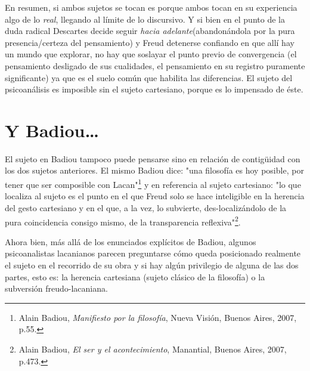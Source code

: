 En resumen, si ambos sujetos se tocan es porque ambos tocan en su
experiencia algo de lo \emph{real}, llegando al límite de lo discursivo.
Y si bien en el punto de la duda radical Descartes decide seguir
\emph{hacia adelante}(abandonándola por la pura presencia/certeza del
pensamiento) y Freud detenerse confiando en que allí hay un mundo que
explorar, no hay que soslayar el punto previo de convergencia (el
pensamiento desligado de sus cualidades, el pensamiento en su registro
puramente significante) ya que es el suelo común que habilita las
diferencias. El sujeto del psicoanálisis es imposible sin el sujeto
cartesiano, porque es lo impensado de éste.

\section{Y Badiou\ldots}

El sujeto en Badiou tampoco puede pensarse sino en relación de
contigüidad con los dos sujetos anteriores. El mismo Badiou dice: "una
filosofía es hoy posible, por tener que ser composible con
Lacan"\footnote{Alain Badiou, \emph{Manifiesto por la filosofía}, Nueva
  Visión, Buenos Aires, 2007, p.55.} y en referencia al sujeto
cartesiano: "lo que localiza al sujeto es el punto en el que Freud solo
se hace inteligible en la herencia del gesto cartesiano y en el que, a
la vez, lo subvierte, des-localizándolo de la pura coincidencia consigo
mismo, de la transparencia reflexiva"\footnote{Alain Badiou, \emph{El
  ser y el acontecimiento}, Manantial, Buenos Aires, 2007, p.473.}.

Ahora bien, más allá de los enunciados explícitos de Badiou, algunos
psicoanalistas lacanianos parecen preguntarse cómo queda posicionado
realmente el sujeto en el recorrido de su obra y si hay algún privilegio
de alguna de las dos partes, esto es: la herencia cartesiana (sujeto
clásico de la filosofía) o la subversión freudo-lacaniana.

